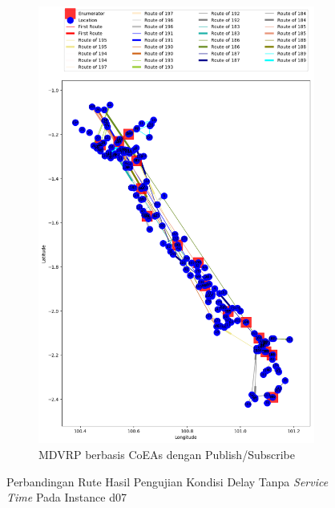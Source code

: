 \begin{figure}[H]\ContinuedFloat
	\centering
	\begin{subfigure}[t]{\textwidth}
		\centering
		\includegraphics[width=\textwidth]{Resources/Images/delayed_7/real_m15_n100_delayed_7_pubsub_coes}
		\caption{MDVRP berbasis CoEAs dengan Publish/Subscribe}
		\label{fig:real_m15_n100_delayed_7_pubsub_coes}
	\end{subfigure}
	\caption{Perbandingan Rute Hasil Pengujian Kondisi Delay Tanpa \textit{Service Time} Pada Instance d07}
	\label{fig:real_m15_n100_delayed_7_contd}
\end{figure}


